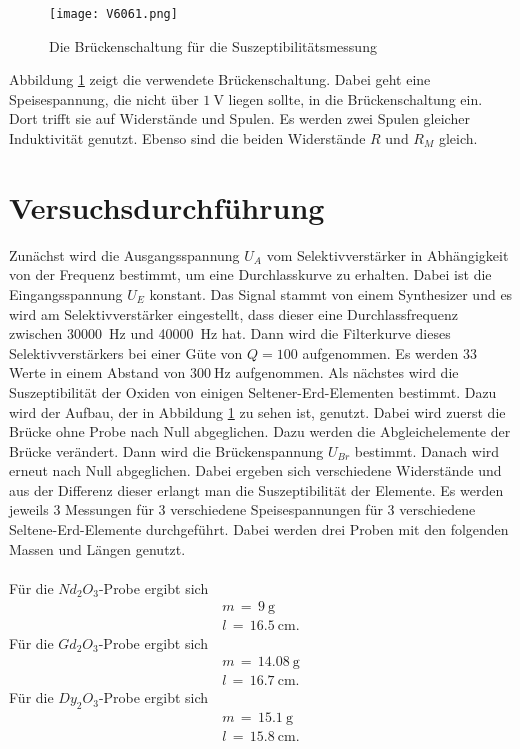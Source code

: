 \documentclass[
  bibliography=totoc,     %
  captions=tableheading,  %
  titlepage=firstiscover, %
]{scrartcl}
\begin{document}
\begin{figure}[H]
  \centering
  \texttt{[image: V6061.png]}
  \caption{Die Brückenschaltung für die Suszeptibilitätsmessung \cite{anleitung}}
  \label{fig:V6063}
\end{figure}
\noindent
Abbildung \ref{fig:V6063} zeigt die verwendete Brückenschaltung. Dabei geht eine Speisespannung, die nicht über $\SI{1}{\volt}$ liegen sollte, in die Brückenschaltung ein. Dort trifft sie auf Widerstände und Spulen. Es werden zwei Spulen gleicher Induktivität genutzt. Ebenso sind die beiden Widerstände $R$ und $R_M$ gleich.
\section{Versuchsdurchführung}
\label{sec:durchführung}
Zunächst wird die Ausgangsspannung $U_A$ vom Selektivverstärker in Abhängigkeit von der Frequenz bestimmt, um eine Durchlasskurve zu erhalten. Dabei ist die Eingangsspannung $U_E$ konstant. Das Signal stammt von einem Synthesizer und es wird am Selektivverstärker eingestellt, dass dieser eine Durchlassfrequenz zwischen \SI{30000}{\hertz} und \SI{40000}{\hertz} hat. Dann wird die Filterkurve dieses Selektivverstärkers bei einer Güte von $Q=100$ aufgenommen. Es werden 33 Werte in einem Abstand von $\SI{300}{\hertz}$ aufgenommen.
Als nächstes wird die Suszeptibilität der Oxiden von einigen Seltener-Erd-Elementen bestimmt. Dazu wird der Aufbau, der in Abbildung \ref{fig:V6063} zu sehen ist, genutzt. Dabei wird zuerst die Brücke ohne Probe nach Null abgeglichen. Dazu werden die Abgleichelemente der Brücke verändert. Dann wird die Brückenspannung $U_{Br}$ bestimmt. Danach wird erneut nach Null abgeglichen. Dabei ergeben sich verschiedene Widerstände und aus der Differenz dieser erlangt man die Suszeptibilität der Elemente. Es werden jeweils 3 Messungen für 3 verschiedene Speisespannungen für 3 verschiedene Seltene-Erd-Elemente durchgeführt.
\noindent
Dabei werden drei Proben mit den folgenden Massen und Längen genutzt. \\
\\
Für die $Nd_2O_3$-Probe ergibt sich
\begin{align*}
  m\,=\,\SI{9}{\gram} \\
  l\,=\,\SI{16.5}{\centi\meter}.
\end{align*}
Für die $Gd_2O_3$-Probe ergibt sich
\begin{align*}
  m\,=\,\SI{14.08}{\gram} \\
  l\,=\,\SI{16.7}{\centi\meter}.
\end{align*}
Für die $Dy_2O_3$-Probe ergibt sich
\begin{align*}
  m\,=\,\SI{15.1}{\gram} \\
  l\,=\,\SI{15.8}{\centi\meter}.
\end{align*}
\end{document}
